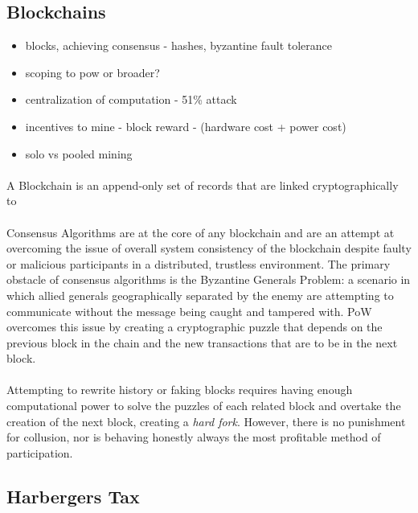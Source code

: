 \subsection{Blockchains}

\begin{itemize}
  \item blocks, achieving consensus - hashes, byzantine fault tolerance
  \item scoping to pow or broader?
  \item centralization of computation - 51\% attack
  \item incentives to mine - block reward - (hardware cost + power cost)
  \item solo vs pooled mining
\end{itemize}  

\paragraph{} A Blockchain is an append-only set of records that are linked cryptographically to 

\paragraph{} Consensus Algorithms are at the core of any blockchain and are an attempt at overcoming the issue of overall system consistency of the blockchain despite faulty or malicious participants in a distributed, trustless environment. The primary obstacle of consensus algorithms is the Byzantine Generals Problem: a scenario in which allied generals geographically separated by the enemy are attempting to communicate without the message being caught and tampered with. PoW overcomes this issue by creating a cryptographic puzzle that depends on the previous block in the chain and the new transactions that are to be in the next block.

\paragraph{} Attempting to rewrite history or faking blocks requires having enough computational power to solve the puzzles of each related block and overtake the creation of the next block, creating a \textit{hard fork}. However, there is no punishment for collusion, nor is behaving honestly always the most profitable method of participation. 

\subsection{Harbergers Tax} \label{section:harbergerstax}

